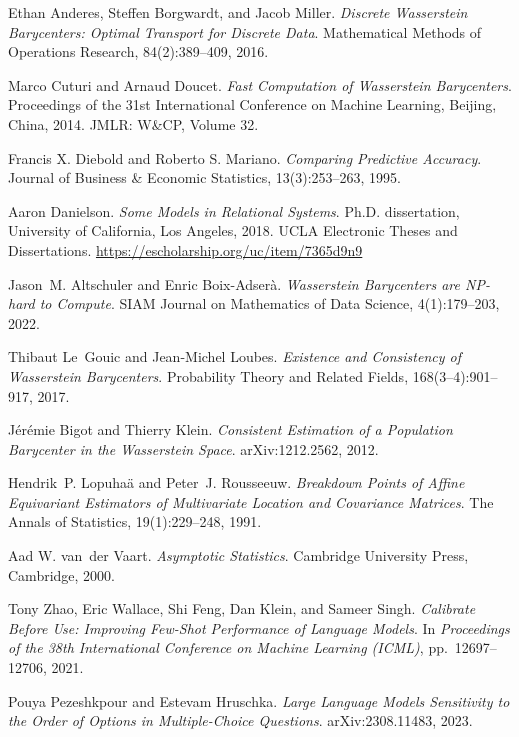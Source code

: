 Ethan Anderes, Steffen Borgwardt, and Jacob Miller.
\textit{Discrete Wasserstein Barycenters: Optimal Transport for Discrete Data}.
Mathematical Methods of Operations Research, 84(2):389--409, 2016.

Marco Cuturi and Arnaud Doucet.
\textit{Fast Computation of Wasserstein Barycenters}.
Proceedings of the 31st International Conference on Machine Learning,
Beijing, China, 2014. JMLR: W\&CP, Volume 32.

Francis X. Diebold and Roberto S. Mariano.
\textit{Comparing Predictive Accuracy}.
Journal of Business \& Economic Statistics, 13(3):253--263, 1995.

Aaron Danielson.
\textit{Some Models in Relational Systems}.
Ph.D. dissertation, University of California, Los Angeles, 2018.
UCLA Electronic Theses and Dissertations.
\url{https://escholarship.org/uc/item/7365d9n9}

Jason~M. Altschuler and Enric Boix-Adser{\`a}.
\textit{Wasserstein Barycenters are {NP}-hard to Compute}.
SIAM Journal on Mathematics of Data Science, 4(1):179--203, 2022.

Thibaut Le~Gouic and Jean-Michel Loubes.
\textit{Existence and Consistency of {W}asserstein Barycenters}.
Probability Theory and Related Fields, 168(3--4):901--917, 2017.

J{\'e}r{\'e}mie Bigot and Thierry Klein.
\textit{Consistent Estimation of a Population Barycenter in the {W}asserstein Space}.
arXiv:1212.2562, 2012.

Hendrik~P. Lopu\-ha{\"a} and Peter~J. Rousseeuw.
\textit{Breakdown Points of Affine Equivariant Estimators of Multivariate Location and Covariance Matrices}.
The Annals of Statistics, 19(1):229--248, 1991.

Aad W. van~der Vaart.
\textit{Asymptotic Statistics}.
Cambridge University Press, Cambridge, 2000.


Tony Zhao, Eric Wallace, Shi Feng, Dan Klein, and Sameer Singh.
\textit{Calibrate Before Use: Improving Few-Shot Performance of Language Models}.
In \textit{Proceedings of the 38th International Conference on Machine Learning (ICML)},
pp.~12697--12706, 2021.

Pouya Pezeshkpour and Estevam Hruschka.
\textit{Large Language Models Sensitivity to the Order of Options in Multiple-Choice Questions}.
arXiv:2308.11483, 2023.

